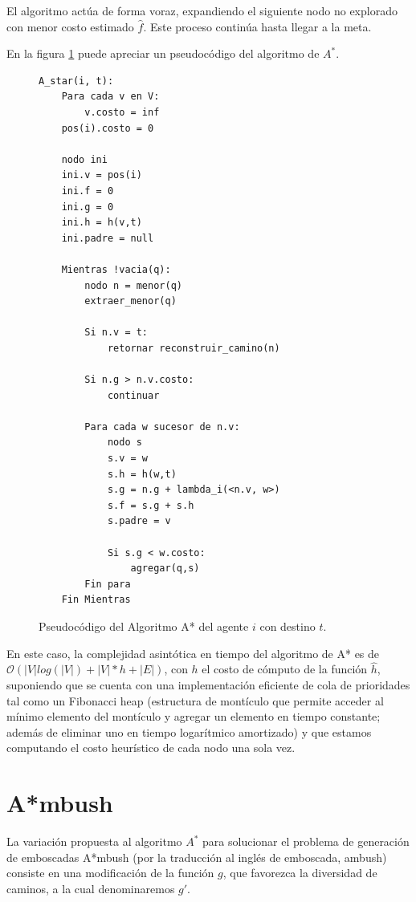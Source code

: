 \documentclass{egpubl}
\newcommand{\bigO}{\mathcal{O}}
\begin{document}
El algoritmo actúa de forma voraz, expandiendo el 
si\-guien\-te nodo no explorado con menor costo estimado $\hat{f}$.
Este proceso continúa hasta llegar a la meta. 

En la figura \ref{fig:astar} puede apreciar un pseudocódigo del
algoritmo de $A^*$.

\begin{figure}[htb]
\begin{verbatim}
A_star(i, t):
    Para cada v en V:
        v.costo = inf
    pos(i).costo = 0

    nodo ini
    ini.v = pos(i)
    ini.f = 0
    ini.g = 0
    ini.h = h(v,t)
    ini.padre = null
    
    Mientras !vacia(q):
        nodo n = menor(q)
        extraer_menor(q)
        
        Si n.v = t:
            retornar reconstruir_camino(n)
        
        Si n.g > n.v.costo:
            continuar
        
        Para cada w sucesor de n.v:
            nodo s
            s.v = w
            s.h = h(w,t)
            s.g = n.g + lambda_i(<n.v, w>)
            s.f = s.g + s.h
            s.padre = v
            
            Si s.g < w.costo:
                agregar(q,s)
        Fin para
    Fin Mientras
\end{verbatim}
\caption{\label{fig:astar}
     Pseudocódigo del Algoritmo A* del agente $i$ con destino $t$.}
\end{figure}


En este caso, la complejidad asintótica en tiempo
del algoritmo de A* es de $\bigO(|V|log(|V|) + |V|*h + |E|)$,
con $h$ el costo de cómputo de la función $\hat{h}$,
suponiendo que se cuenta con una implementación eficiente de
cola de prioridades tal como un Fibonacci heap \cite{CLRS09} (estructura
de montículo que permite acceder al mínimo elemento del montículo
y agregar un elemento en tiempo constante; además de
e\-li\-mi\-nar uno en tiempo logarítmico amortizado) y que estamos
computando el costo heurístico de cada nodo una sola vez.

\section{A*mbush}

La variación propuesta al algoritmo $A^*$ para solucionar
el problema de generación de emboscadas A*mbush (por la
traducción al inglés de emboscada, ambush) consiste en
una modificación de la función $g$, que favorezca la
diversidad de caminos, a la cual denominaremos $g'$.
\end{document}
